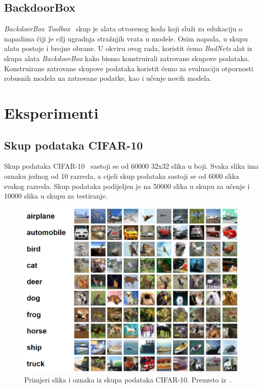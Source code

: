 \documentclass[times, utf8, zavrsni, numeric]{fer}
\begin{document}
\section{BackdoorBox}

\textit{BackdoorBox Toolbox}~\cite{li2023backdoorbox} skup je alata otvorenog koda koji služi za edukaciju o napadima čiji je cilj ugradnja stražnjih vrata u modele.
Osim napada, u skupu alata postoje i brojne obrane. U okviru ovog rada, koristit ćemo \textit{BadNets} alat iz skupa alata \textit{BackdoorBox} kako bismo konstruirali zatrovane skupove podataka.
Konstruirane zatrovane skupove podataka koristit ćemo za evaluaciju otpornosti robusnih modela na zatrovane podatke, kao i učenje novih modela.

\chapter{Eksperimenti}

\section{Skup podataka CIFAR-10}

Skup podataka CIFAR-10~\cite{krizhevsky2009learning} sastoji se od 60000 32x32 slika u boji. Svaka slika ima oznaku jednog od 10 razreda,
a cijeli skup podataka sastoji se od 6000 slika svakog razreda. Skup podataka podijeljen je na 50000 slika u skupu za učenje i 10000 slika u skupu za testiranje.

\begin{figure}[htb]
    \centering
    \includegraphics[scale=0.5]{cifar.png}
    \caption{Primjeri slika i oznaka iz skupa podataka CIFAR-10. Preuzeto iz~\cite{krizhevsky2009learning}.}
    \label{fig:cifar10}
\end{figure}
\end{document}
